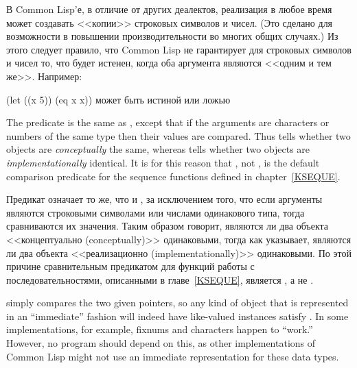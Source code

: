 \begin{defun}[Function]
В Common Lisp'е, в отличие от других деалектов, реализация в любое время может
создавать <<копии>> строковых символов и чисел. (Это сделано для возможности в
повышении производительности во многих общих случаях.) Из этого следует правило,
что Common Lisp не гарантирует для строковых символов и чисел то, что 
будет истенен, когда оба аргумента являются <<одним и тем же>>.
Например:
\begin{lisp}
(let ((x 5)) (eq x x)) \textrm{может быть истиной или ложью}
\end{lisp}

The predicate  is the same as , except that if the
arguments are characters or numbers of the same type then their
values are compared.  Thus  tells whether two objects
are \emph{conceptually} the same, whereas  tells whether two
objects are \emph{implementationally} identical.  It is for this reason
that , not , is the default comparison predicate
for the sequence functions defined in chapter~\ref{KSEQUE}.

Предикат  означает то же, что и , за исключением того, что если
аргументы являются строковыми символами или числами одинакового типа, тогда
сравниваются их значения. Таким образом  говорит, являются ли два объекта
<<концептуально (conceptually)>> одинаковыми, тогда как  указывает, являются ли два
объекта <<реализационно (implementationally)>> одинаковыми. По этой причине
сравнительным предикатом для функций работы с последовательностями, описанными в
главе~\ref{KSEQUE}, является , а не .

\beforenoterule
\begin{implementation}
 simply compares the two given pointers,
so any kind of object that is represented in an ``immediate'' fashion
will indeed have like-valued instances satisfy .
In some implementations, for example,
fixnums and characters happen to ``work.''
However, no program should depend on this, as other implementations
of Common Lisp might not use an immediate representation for these data types.
\end{implementation}
\afternoterule


\end{defun}
